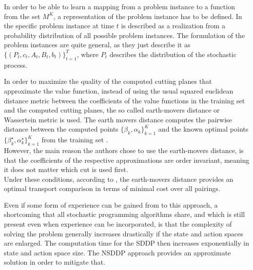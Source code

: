 In order to be able to learn a mapping from a problem instance to a function from the set $M^K$, a representation of the problem instance has to be defined.
In \cite{NSDDP} the specific problem instance at time $t$ is described as a realization from a probability distribution of all possible problem instances.
The formulation of the problem instances are quite general, as they just describe it as $\{(P_t, c_t, A_t, B_t, b_t)  \}_{t=1}^{T}$, where $P_t$ describes the distribution of the stochastic process.

In order to maximize the quality of the computed cutting planes that approximate the value function, instead of using the usual squared euclidean distance metric between the coefficients of the value functions in the training set and the computed cutting planes, the so called earth-movers distance or Wassertein metric is used.
The earth movers distance computes the pairwise distance between the computed points $\{\beta_k, \alpha_k\}_{k=1}^{K}$ and the known optimal points $\{\beta_k^{\star}, \alpha_k^{\star}\}_{k=1}^{K}$ from the training set \cite{NSDDP}. \\
However, the main reason the authors chose to use the earth-movers distance, is that the coefficients of the respective approximations are order invariant, meaning it does not matter which cut is used first. \\
Under these conditions, according to \cite{NSDDP}, the earth-movers distance provides an optimal transport comparison in terms of minimal cost over all pairings.

Even if some form of experience can be gained from to this approach, a shortcoming that all stochastic programming algorithms share, and which is still present even when experience can be incorporated, is that the complexity of solving the problem generally increases drastically if the state and action spaces are enlarged.
The computation time for the SDDP then increases exponentially in state and action space size.
The NSDDP approach provides an approximate solution in order to mitigate that.

